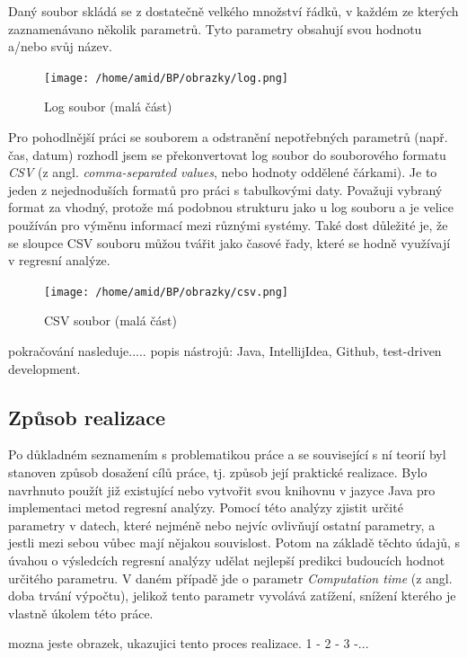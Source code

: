 \documentclass[a4paper,12pt,twoside]{scrreprt}
\begin{document}
Daný soubor skládá se z dostatečně velkého množství řádků, v každém ze kterých zaznamenávano několik parametrů. Tyto parametry obsahují svou hodnotu a/nebo svůj název. 

\begin{figure}[h]
  \centering
  \texttt{[image: /home/amid/BP/obrazky/log.png]}
  \caption{Log soubor (malá část)}
  \label{fig:log}
\end{figure}

Pro pohodlnější práci se souborem a odstranění nepotřebných parametrů (např. čas, datum) rozhodl jsem se překonvertovat log soubor do souborového formatu \textit{CSV} 	(z angl. \textit{comma-separated values}, nebo hodnoty oddělené čárkami). Je to jeden z nejednoduších formatů pro práci s tabulkovými daty. Považuji vybraný format za vhodný, protože má podobnou strukturu jako u log souboru a je velice používán pro výměnu informací mezi různými systémy. Také dost důležité je, že se sloupce CSV souboru můžou tvářit jako časové řady, které se hodně využívají v regresní analýze.   

\begin{figure}
  \centering
  \texttt{[image: /home/amid/BP/obrazky/csv.png]}
  \caption{CSV soubor (malá část)}
  \label{fig:csv}
\end{figure}


pokračování nasleduje..... popis nástrojů: Java, IntellijIdea, Github, test-driven development.  


\subsection{Způsob realizace}

Po důkladném seznamením s problematikou práce a se související s ní teorií byl stanoven způsob dosažení cílů práce, tj. způsob její praktické realizace. Bylo navrhnuto použít již existující nebo vytvořit svou knihovnu v jazyce Java pro implementaci metod regresní analýzy. Pomocí této analýzy zjistit určité parametry v datech, které nejméně nebo nejvíc ovlivňují ostatní parametry, a jestli mezi sebou vůbec mají nějakou souvislost. Potom na základě těchto údajů, s úvahou o výsledcích regresní analýzy udělat nejlepší predikci budoucích hodnot určitého parametru. V daném případě jde o parametr \textit{Computation time} (z angl. doba trvání výpočtu), jelikož tento parametr vyvolává zatížení, snížení kterého je vlastně úkolem této práce. 


mozna jeste obrazek, ukazujici tento proces realizace. 1 - 2 - 3 -...
\end{document}

